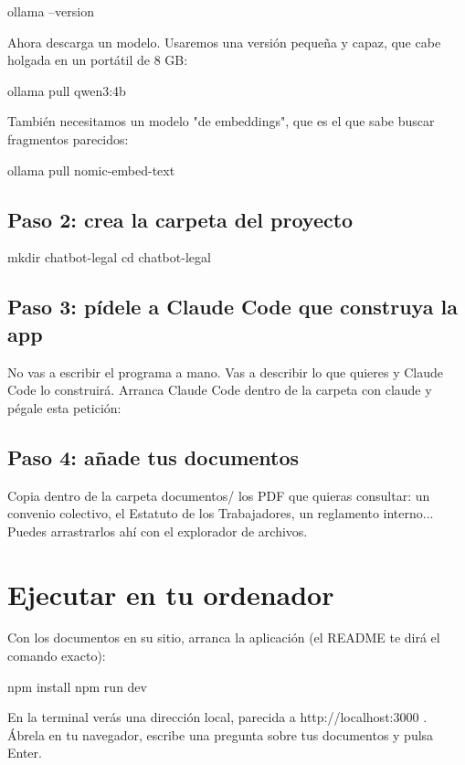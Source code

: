 \documentclass[11pt,a4paper]{book}
\begin{document}
\begin{codebox}
ollama --version
\end{codebox}
Ahora descarga un modelo. Usaremos una versión pequeña y capaz, que cabe holgada en un portátil de 8 GB:

\begin{codebox}
ollama pull qwen3:4b
\end{codebox}
También necesitamos un modelo "de embeddings", que es el que sabe buscar fragmentos parecidos:

\begin{codebox}
ollama pull nomic-embed-text
\end{codebox}
\subsection{Paso 2: crea la carpeta del proyecto}
\begin{codebox}
mkdir chatbot-legal
cd chatbot-legal
\end{codebox}
\subsection{Paso 3: pídele a Claude Code que construya la app}
No vas a escribir el programa a mano. Vas a describir lo que quieres y Claude Code lo construirá. Arranca Claude Code dentro de la carpeta con claude y pégale esta petición:

\subsection{Paso 4: añade tus documentos}
Copia dentro de la carpeta documentos/ los PDF que quieras consultar: un convenio colectivo, el Estatuto de los Trabajadores, un reglamento interno... Puedes arrastrarlos ahí con el explorador de archivos.

\section{Ejecutar en tu ordenador}
Con los documentos en su sitio, arranca la aplicación (el README te dirá el comando exacto):

\begin{codebox}
npm install
npm run dev
\end{codebox}
En la terminal verás una dirección local, parecida a http://localhost:3000 . Ábrela en tu navegador, escribe una pregunta sobre tus documentos y pulsa Enter.
\end{document}
